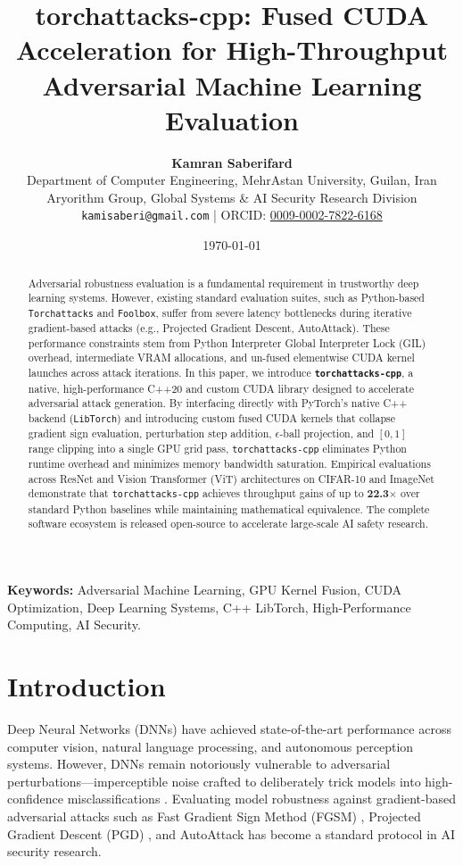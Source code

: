 \documentclass[11pt,onecolumn,a4paper]{article}
\title{\textbf{torchattacks-cpp: Fused CUDA Acceleration for High-Throughput Adversarial Machine Learning Evaluation}}
\author{
    \textbf{Kamran Saberifard}\\[0.5em]
    \small Department of Computer Engineering, MehrAstan University, Guilan, Iran\\
    \small Aryorithm Group, Global Systems \& AI Security Research Division\\
    \small \texttt{kamisaberi@gmail.com} | ORCID: \href{https://orcid.org/0009-0002-7822-6168}{0009-0002-7822-6168}
}
\date{\today}
\begin{document}
\maketitle

\begin{abstract}
Adversarial robustness evaluation is a fundamental requirement in trustworthy deep learning systems. However, existing standard evaluation suites, such as Python-based \texttt{Torchattacks} and \texttt{Foolbox}, suffer from severe latency bottlenecks during iterative gradient-based attacks (e.g., Projected Gradient Descent, AutoAttack). These performance constraints stem from Python Interpreter Global Interpreter Lock (GIL) overhead, intermediate VRAM allocations, and un-fused elementwise CUDA kernel launches across attack iterations. In this paper, we introduce \textbf{\texttt{torchattacks-cpp}}, a native, high-performance C++20 and custom CUDA library designed to accelerate adversarial attack generation. By interfacing directly with PyTorch's native C++ backend (\texttt{LibTorch}) and introducing custom fused CUDA kernels that collapse gradient sign evaluation, perturbation step addition, $\epsilon$-ball projection, and $[0,1]$ range clipping into a single GPU grid pass, \texttt{torchattacks-cpp} eliminates Python runtime overhead and minimizes memory bandwidth saturation. Empirical evaluations across ResNet and Vision Transformer (ViT) architectures on CIFAR-10 and ImageNet demonstrate that \texttt{torchattacks-cpp} achieves throughput gains of up to \textbf{22.3$\times$} over standard Python baselines while maintaining mathematical equivalence. The complete software ecosystem is released open-source to accelerate large-scale AI safety research.
\end{abstract}

\textbf{Keywords:} Adversarial Machine Learning, GPU Kernel Fusion, CUDA Optimization, Deep Learning Systems, C++ LibTorch, High-Performance Computing, AI Security.

\hrulefill

\section{Introduction}
Deep Neural Networks (DNNs) have achieved state-of-the-art performance across computer vision, natural language processing, and autonomous perception systems. However, DNNs remain notoriously vulnerable to adversarial perturbations—imperceptible noise crafted to deliberately trick models into high-confidence misclassifications \cite{goodfellow2014explaining, madry2018towards}. Evaluating model robustness against gradient-based adversarial attacks such as Fast Gradient Sign Method (FGSM) \cite{goodfellow2014explaining}, Projected Gradient Descent (PGD) \cite{madry2018towards}, and AutoAttack \cite{croce2020reliable} has become a standard protocol in AI security research.
\end{document}

